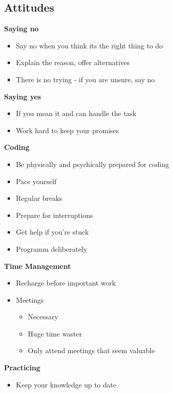 \subsection{Attitudes}
\textbf{Saying no}
\begin{itemize}
    \item Say no when you think its the right thing to do
    \item Explain the reason, offer alternatives
    \item There is no trying - if you are unsure, say no
\end{itemize}
\textbf{Saying yes}
\begin{itemize}
    \item If you mean it and can handle the task
    \item Work hard to keep your promises
\end{itemize}
\textbf{Coding}
\begin{itemize}
    \item Be physically and psychically prepared for coding
    \item Pace yourself
    \item Regular breaks
    \item Prepare for interruptions
    \item Get help if you're stuck
    \item Programm deliberately
\end{itemize}
\textbf{Time Management}
\begin{itemize}
    \item Recharge before important work
    \item Meetings
    \begin{itemize}
        \item Necessary
        \item Huge time waster
        \item Only attend meetings that seem valuable
    \end{itemize}
\end{itemize}
\textbf{Practicing}
\begin{itemize}
    \item Keep your knowledge up to date
\end{itemize}

